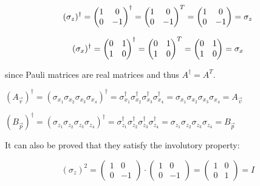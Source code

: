 \documentclass{Configuration_Files/PoliMi3i_thesis}
\begin{document}
\[
\text{$( \sigma_z )^{\dagger}$} = 
\begin{pmatrix}
	1 & 0 \\
	0 & -1
\end{pmatrix} ^\dagger =
\begin{pmatrix}
	1 & 0 \\
	0 & -1
\end{pmatrix}^T =
\begin{pmatrix}
	1 & 0 \\
	0 & -1
\end{pmatrix}
= \text{$ \sigma_z $}
\]


\[
\text{$( \sigma_x )^{\dagger}$} = 
\begin{pmatrix}
	0 & 1 \\
	1 & 0
\end{pmatrix} ^\dagger =
\begin{pmatrix}
	0 & 1 \\
	1 & 0
\end{pmatrix}^T =
\begin{pmatrix}
	0 & 1 \\
	1 & 0
\end{pmatrix}
= \text{$ \sigma_x $}
\]\newline

since Pauli matrices are real matrices and thus $A^{\dagger}=A^T$.

\begin{center}
	$(A_{\vec{v}})^{\dagger} = (\sigma_{x_1} \sigma_{x_2} \sigma_{x_3} \sigma_{x_4})^{\dagger} = \sigma_{x_1}^{\dagger} \sigma_{x_2}^{\dagger} \sigma_{x_3}^{\dagger} \sigma_{x_4}^{\dagger} = \sigma_{x_1} \sigma_{x_2} \sigma_{x_3} \sigma_{x_4} = A_{\vec{v}}$ \newline
	
	$(B_{\vec{p}})^{\dagger} = (\sigma_{z_1} \sigma_{z_2} \sigma_{z_3} \sigma_{z_4})^{\dagger} = \sigma_{z_1}^{\dagger} \sigma_{z_2}^{\dagger} \sigma_{z_3}^{\dagger} \sigma_{z_4}^{\dagger} = \sigma_{z_1} \sigma_{z_2} \sigma_{z_3} \sigma_{z_4} = B_{\vec{p}}$ \newline
\end{center}

It can also be proved that they satisfy the involutory property:\newline

\[
\text{$( \sigma_z )^{2}$} = 
\begin{pmatrix}
	1 & 0 \\
	0 & -1
\end{pmatrix} \cdot
\begin{pmatrix}
	1 & 0 \\
	0 & -1
\end{pmatrix} =
\begin{pmatrix}
	1 & 0 \\
	0 & 1
\end{pmatrix}
= \text{$I$}
\]
\end{document}
